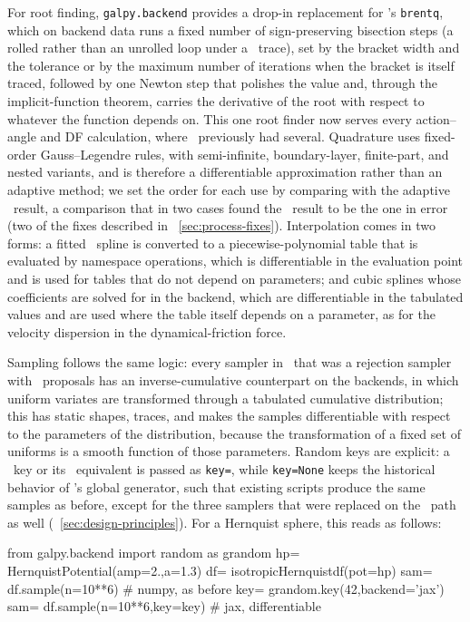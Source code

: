 For root finding, \texttt{galpy.backend} provides a drop-in replacement
for \scipy's \texttt{brentq}, which on backend data runs a fixed number
of sign-preserving bisection steps (a rolled rather than an unrolled
loop under a \jax\ trace), set by the bracket width and the tolerance or
by the maximum number of iterations when the bracket is itself traced,
followed by one Newton step that polishes the value and, through the
implicit-function theorem, carries the derivative of the root with
respect to whatever the function depends on. This one root finder now
serves every action--angle and DF calculation, where \galpy\ previously
had several. Quadrature uses fixed-order Gauss--Legendre rules, with
semi-infinite, boundary-layer, finite-part, and nested variants, and is
therefore a differentiable approximation rather than an adaptive method;
we set the order for each use by comparing with the adaptive \scipy\
result, a comparison that in two cases found the \scipy\ result to be
the one in error (two of the fixes described in
\sectionname~\ref{sec:process-fixes}).
Interpolation comes in two forms: a fitted \scipy\ spline is converted to
a piecewise-polynomial table that is evaluated by namespace operations,
which is differentiable in the evaluation point and is used for tables
that do not depend on parameters; and cubic splines whose coefficients
are solved for in the backend, which are differentiable in the tabulated
values and are used where the table itself depends on a parameter, as
for the velocity dispersion in the dynamical-friction force.

Sampling follows the same logic: every sampler in \galpy\ that was a
rejection sampler with \numpy\ proposals has an inverse-cumulative
counterpart on the backends, in which uniform variates are transformed
through a tabulated cumulative distribution; this has static shapes,
traces, and makes the samples differentiable with respect to the
parameters of the distribution, because the transformation of a fixed
set of uniforms is a smooth function of those parameters. Random keys
are explicit: a \jax\ key or its \torch\ equivalent is passed as
\texttt{key=}, while \texttt{key=None} keeps the historical behavior of
\numpy's global generator, such that existing scripts produce the same
samples as before, except for the three samplers that were replaced on
the \numpy\ path as well (\sectionname~\ref{sec:design-principles}). For
a Hernquist sphere, this reads as follows:
\begin{code}
from galpy.backend import random as grandom
hp= HernquistPotential(amp=2.,a=1.3)
df= isotropicHernquistdf(pot=hp)
sam= df.sample(n=10**6)          # numpy, as before
key= grandom.key(42,backend='jax')
sam= df.sample(n=10**6,key=key)  # jax, differentiable
\end{code}

